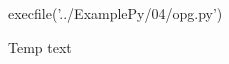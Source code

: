 \documentclass[../main.tex]{subfiles}
\begin{document}
\begin{pycode}[04]
execfile('../ExamplePy/04/opg.py')
\end{pycode}


Temp text
	
\end{document}
